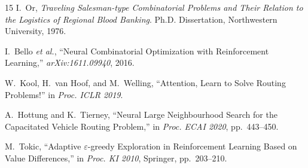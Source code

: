 \documentclass[10pt,twocolumn]{article}
\begin{document}
\begin{thebibliography}{15}
I.~Or,
\textit{Traveling Salesman-type Combinatorial Problems and Their Relation to the
Logistics of Regional Blood Banking}.
Ph.D. Dissertation, Northwestern University, 1976.

I.~Bello \textit{et al.},
``Neural Combinatorial Optimization with Reinforcement Learning,''
\textit{arXiv:1611.09940}, 2016.

W.~Kool, H.~van Hoof, and M.~Welling,
``Attention, Learn to Solve Routing Problems!''
in \textit{Proc. ICLR 2019}.

A.~Hottung and K.~Tierney,
``Neural Large Neighbourhood Search for the Capacitated Vehicle Routing Problem,''
in \textit{Proc. ECAI 2020}, pp.~443--450.

M.~Tokic,
``Adaptive $\varepsilon$-greedy Exploration in Reinforcement Learning Based on
Value Differences,''
in \textit{Proc. KI 2010}, Springer, pp.~203--210.

\end{thebibliography}
\end{document}
